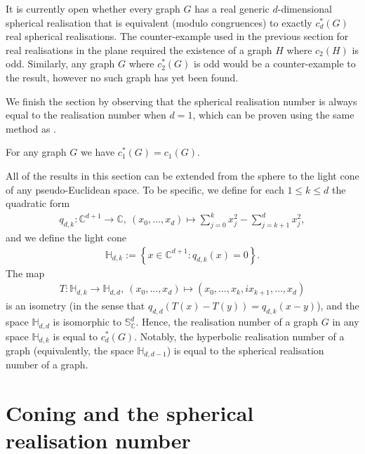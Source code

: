 \begin{remark}
	It is currently open whether every graph $G$ has a real generic $d$-dimensional spherical realisation that is equivalent (modulo congruences) to exactly $c_d^*(G)$ real spherical realisations.
	The counter-example used in the previous section for real realisations in the plane required the existence of a graph $H$ where $c_2(H)$ is odd.
	Similarly, any graph $G$ where $c^*_2(G)$ is odd would be a counter-example to the result, however no such graph has yet been found.
\end{remark}

We finish the section by observing that the spherical realisation number is always equal to the realisation number when $d=1$,
which can be proven using the same method as .

\begin{proposition}\label{p:1dsame}
	For any graph $G$ we have $c_1^*(G) =c_1(G)$.
\end{proposition}

\begin{remark}\label{rem:hyperbolic}
	All of the results in this section can be extended from the sphere to the light cone of any pseudo-Euclidean space.
	To be specific,
	we define for each $1 \leq k \leq d$ the quadratic form
	\begin{align*}
		q_{d,k}: \mathbb{C}^{d+1} \rightarrow \mathbb{C}, ~ (x_0,\ldots,x_{d}) \mapsto \sum_{j=0}^k x_j^2 - \sum_{j=k+1}^d x_j^2,
	\end{align*}
	and we define the light cone
	\begin{align*}
		\mathbb{H}_{d,k} := \left\{ x \in \mathbb{C}^{d+1} : q_{d,k}(x) = 0 \right\}.
	\end{align*}
	The map
	\begin{align*}
		T:\mathbb{H}_{d,k} \rightarrow \mathbb{H}_{d,d}, ~ (x_0,\ldots,x_d) \mapsto (x_0,\ldots, x_k, ix_{k+1},\ldots,x_d)
	\end{align*}
	is an isometry (in the sense that $q_{d,d}(T(x) - T(y)) = q_{d,k}(x-y)$),
	and the space $\mathbb{H}_{d,d}$ is isomorphic to $\mathbb{S}_{\mathbb{C}}^d$.
	Hence, the realisation number of a graph $G$ in any space $\mathbb{H}_{d,k}$ is equal to $c^*_d(G)$.
	Notably,
	the hyperbolic realisation number of a graph (equivalently, the space $\mathbb{H}_{d,d-1}$) is equal to the spherical realisation number of a graph. 
\end{remark}



\section{Coning and the spherical realisation number}\label{sec:cone}

